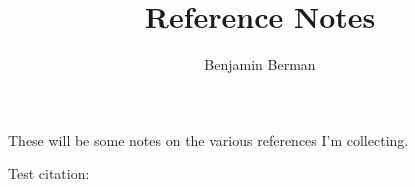 \documentclass[11pt]{amsart}
\title{Reference Notes}
\author{Benjamin Berman}
\begin{document}
\maketitle

These will be some notes on the various references I'm collecting.

Test citation: \cite{Anderson92}



\end{document}
